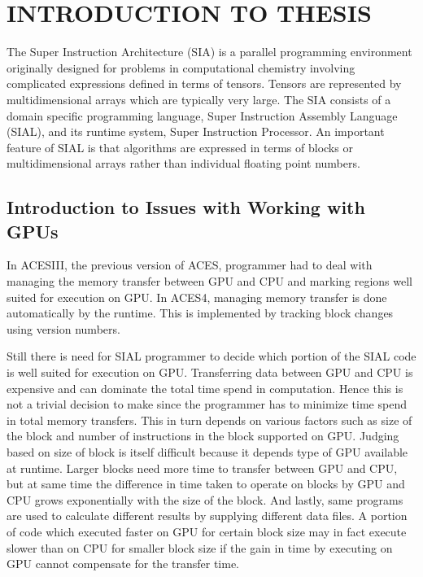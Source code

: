 \chapter{INTRODUCTION TO THESIS} \label{intro}

The Super Instruction Architecture (SIA) is a parallel programming environment
originally designed for problems in computational chemistry involving complicated
expressions defined in terms of tensors. Tensors are represented by
multidimensional arrays which are typically very large. The SIA consists of a
domain specific programming language, Super Instruction Assembly Language
(SIAL), and its runtime system, Super Instruction Processor. An important
feature of SIAL is that algorithms are expressed in terms of blocks or
multidimensional arrays rather than individual floating point numbers.

\section{Introduction to Issues with Working with GPUs}

In ACESIII, the previous version of ACES, programmer had to deal with managing
the memory transfer between GPU and CPU and marking regions well suited for execution
on GPU. In ACES4, managing memory transfer is done automatically by the runtime.
This is implemented by tracking block changes using version numbers.

Still there is need for SIAL programmer to decide which portion of the SIAL code
is well suited for execution on GPU. Transferring data between GPU and CPU is
expensive and can dominate the total time spend in computation. Hence this is not
a trivial decision to make since the programmer has to minimize time spend in
total memory transfers. This in turn depends on various factors such as
size of the block and number of instructions in the block supported on GPU. Judging
based on size of block is itself difficult because it depends type of GPU available
at runtime. Larger blocks need more time to transfer between GPU and CPU, but at
same time the difference in time taken to operate on blocks by GPU and CPU grows
exponentially with the size of the block. And lastly, same programs are used to
calculate different results by supplying different data files. A portion of code
which executed faster on GPU for certain block size may in fact execute slower
than on CPU for smaller block size if the gain in time by executing on GPU cannot
compensate for the transfer time.

